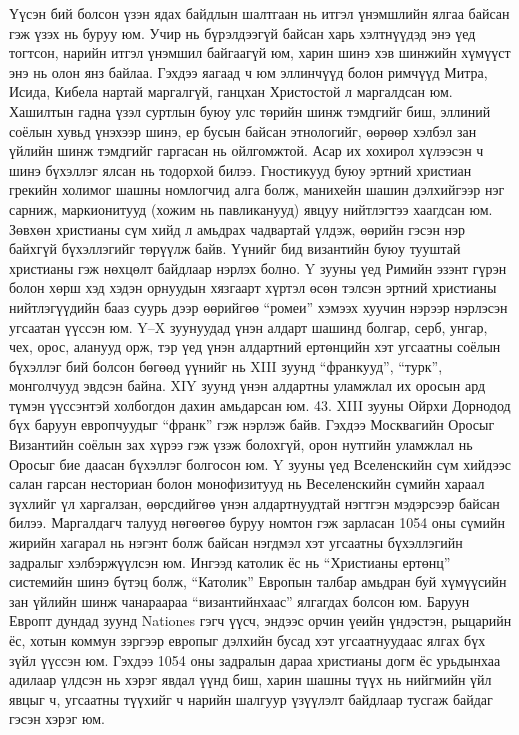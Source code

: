 Үүсэн бий болсон үзэн ядах байдлын шалтгаан нь итгэл үнэмшлийн ялгаа байсан гэж үзэх нь буруу юм. Учир нь бүрэлдээгүй байсан харь хэлтнүүдэд энэ үед тогтсон, нарийн итгэл үнэмшил байгаагүй юм, харин шинэ хэв шинжийн хүмүүст энэ нь олон янз байлаа. Гэхдээ яагаад ч юм эллинчүүд болон римчүүд Митра, Исида, Кибела нартай маргалгүй, ганцхан Христостой л маргалдсан юм. Хашилтын гадна үзэл суртлын буюу улс төрийн шинж тэмдгийг биш, эллиний соёлын хувьд үнэхээр шинэ, ер бусын байсан этнологийг, өөрөөр хэлбэл зан үйлийн шинж тэмдгийг гаргасан нь ойлгомжтой.
Асар их хохирол хүлээсэн ч шинэ бүхэллэг ялсан нь тодорхой билээ. Гностикууд буюу эртний христиан грекийн холимог шашны номлогчид алга болж, манихейн шашин дэлхийгээр нэг сарниж, маркионитууд (хожим нь павликанууд) явцуу нийтлэгтээ хаагдсан юм. Зөвхөн христианы сүм хийд л амьдрах чадвартай үлдэж, өөрийн гэсэн нэр байхгүй бүхэллэгийг төрүүлж байв. Үүнийг бид византийн буюу тууштай христианы гэж нөхцөлт байдлаар нэрлэх болно. Y зууны үед Римийн эзэнт гүрэн болон хөрш хэд хэдэн орнуудын хязгаарт хүртэл өсөн тэлсэн эртний христианы нийтлэгүүдийн бааз суурь дээр өөрийгөө “ромеи” хэмээх хуучин нэрээр нэрлэсэн угсаатан үүссэн юм. Y–X зуунуудад үнэн алдарт шашинд болгар, серб, унгар, чех, орос, аланууд орж, тэр үед үнэн алдартний ертөнцийн хэт угсаатны соёлын бүхэллэг бий болсон бөгөөд үүнийг нь XIII зуунд “франкууд”, “турк”, монголчууд эвдсэн байна. XIY зуунд үнэн алдартны уламжлал их оросын ард түмэн үүссэнтэй холбогдон дахин амьдарсан юм. 43. XIII зууны Ойрхи Дорнодод бүх баруун европчуудыг “франк” гэж нэрлэж байв.
Гэхдээ Москвагийн Оросыг Византийн соёлын зах хүрээ гэж үзэж болохгүй, орон нутгийн уламжлал нь Оросыг бие даасан бүхэллэг болгосон юм. Y зууны үед Вселенскийн сүм хийдээс салан гарсан несториан болон монофизитууд нь Веселенскийн сүмийн хараал зүхлийг үл харгалзан, өөрсдийгөө үнэн алдартнуудтай нэгтгэн мэдэрсээр байсан билээ. Маргалдагч талууд нөгөөгөө буруу номтон гэж зарласан 1054 оны сүмийн жирийн хагарал нь нэгэнт болж байсан нэгдмэл хэт угсаатны бүхэллэгийн задралыг хэлбэржүүлсэн юм. Ингээд католик ёс нь “Христианы ертөнц” системийн шинэ бүтэц болж, “Католик” Европын талбар амьдран буй хүмүүсийн зан үйлийн шинж чанараараа “византийнхаас” ялгагдах болсон юм. Баруун Европт дундад зуунд Nationes гэгч үүсч, эндээс орчин үеийн үндэстэн, рыцарийн ёс, хотын коммун зэргээр европыг дэлхийн бусад хэт угсаатнуудаас ялгах бүх зүйл үүссэн юм.
Гэхдээ 1054 оны задралын дараа христианы догм ёс урьдынхаа адилаар үлдсэн нь хэрэг явдал үүнд биш, харин шашны түүх нь нийгмийн үйл явцыг ч, угсаатны түүхийг ч нарийн шалгуур үзүүлэлт байдлаар тусгаж байдаг гэсэн хэрэг юм.
